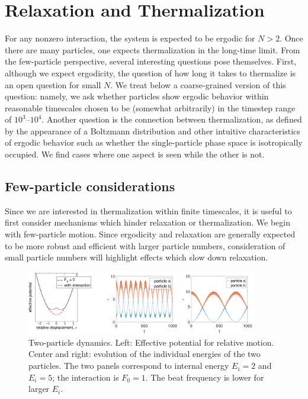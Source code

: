 \documentclass[a4paper, onecolumn]{revtex4-1}
\begin{document}
\section{Relaxation and Thermalization}\label{sec:relaxation}


For any nonzero interaction, the system is expected to be ergodic for $N>2$.  Once there are many
particles, one expects thermalization in the long-time limit.  From the few-particle perspective,
several interesting questions pose themselves.  First, although we expect ergodicity, the question
of how long it takes to thermalize is an open question for small $N$. We treat below a
coarse-grained version of this question: namely, we ask whether particles show ergodic behavior
within reasonable timescales chosen to be (somewhat arbitrarily) in the timestep range of
$10^3$--$10^4$.  Another question is the connection between thermalization, as defined by the
appearance of a Boltzmann distribution and other intuitive characteristics of ergodic behavior such
as whether the single-particle phase space is isotropically occupied.  We find cases where one
aspect is seen while the other is not.  







\subsection{Few-particle considerations}

Since we are interested in thermalization within finite timescales, it is useful to first consider
mechanisms which hinder relaxation or thermalization.  We begin with few-particle motion.  Since
ergodicity and relaxation are generally expected to be more robust and efficient with larger
particle numbers, consideration of small particle numbers will highlight effects which slow down
relaxation.



\begin{figure}[tb]
\centering
\includegraphics[width=0.9\textwidth]{ZhiyuPictures/two_particles_a_01.pdf}
\caption{Two-particle dynamics.  Left: Effective potential for relative motion.  Center and right:
  evolution of the individual energies of the two particles.  The two panels correspond to internal
  energy $E_i=2$ and $E_i=5$; the interaction is $F_0=1$.  The beat frequency is lower for larger
  $E_i$. }
\label{fig:thermalization2}
\end{figure}
\end{document}
